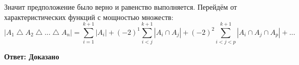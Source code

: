 \documentclass[a4paper,12pt]{article} %
\begin{document}
Значит предположение было верно и равенство выполняется. Перейдём от характеристических функций с мощностью множеств:
\[|A_1 \bigtriangleup A_2 \bigtriangleup ... \bigtriangleup A_n| = \sum_{i=1}^{k+1} |A_i| + (-2)^1\sum_{i < j}^{k+1} |A_i\cap A_j| + (-2)^2\sum_{i < j < p}^{k+1} |A_i\cap A_j\cap A_p| + ...\]


\begin{flushright}
\begin{large}
\textbf {Ответ: Доказано}
\end{large}
\end{flushright}
\end{document}
